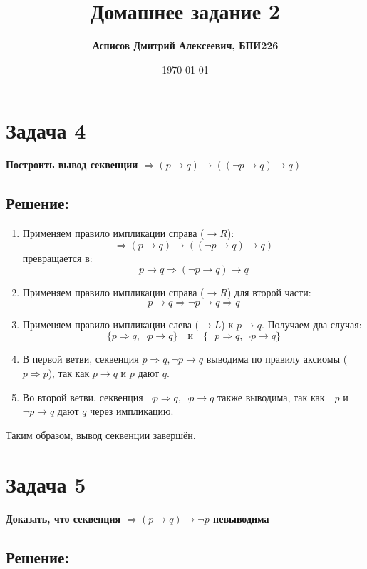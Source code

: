 \documentclass[12pt,a4paper]{article}
\author{\textbf{Асписов Дмитрий Алексеевич, БПИ226}}
\date{\today}
\title{\textbf{Домашнее задание 2}}
\newcommand{\zadacha}[2]{\section*{Задача #1} \textcolor{myblue}{\textbf{#2}}}
\begin{document}
\maketitle

\zadacha{4}{Построить вывод секвенции \( \Rightarrow (p \to q) \to ((\neg p \to q) \to q) \)}

\subsection*{Решение:}

\begin{enumerate}
    \item Применяем правило импликации справа ($\to R$):
    \[
    \Rightarrow (p \to q) \to ((\neg p \to q) \to q)
    \]
    превращается в:
    \[
    p \to q \Rightarrow (\neg p \to q) \to q
    \]
    
    \item Применяем правило импликации справа ($\to R$) для второй части:
    \[
    p \to q \Rightarrow \neg p \to q \Rightarrow q
    \]
    
    \item Применяем правило импликации слева ($\to L$) к $p \to q$. Получаем два случая:
    \[
    \{p \Rightarrow q, \neg p \to q\} \quad \text{и} \quad \{\neg p \Rightarrow q, \neg p \to q\}
    \]
    
    \item В первой ветви, секвенция $p \Rightarrow q, \neg p \to q$ выводима по правилу аксиомы ($p \Rightarrow p$), так как $p \to q$ и $p$ дают $q$.

    \item Во второй ветви, секвенция $\neg p \Rightarrow q, \neg p \to q$ также выводима, так как $\neg p$ и $\neg p \to q$ дают $q$ через импликацию.
\end{enumerate}

Таким образом, вывод секвенции завершён.



\zadacha{5}{Доказать, что секвенция \( \Rightarrow (p \to q) \to \neg p \) невыводима}

\subsection*{Решение:}
\end{document}
